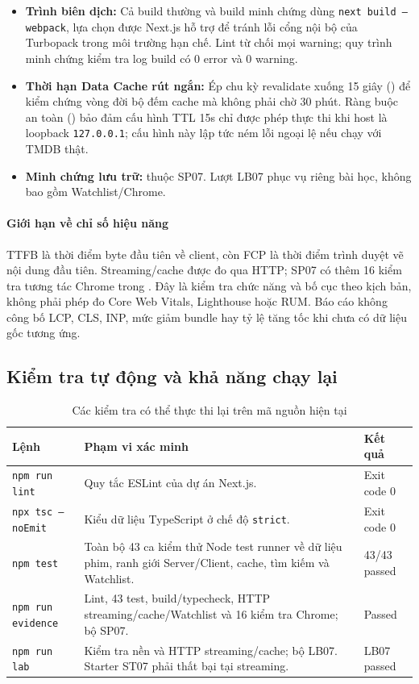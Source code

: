 \documentclass[12pt,a4paper]{extarticle}
\begin{document}
\begin{enumerate}[noitemsep]
\begin{itemize}[noitemsep]
        \item \textbf{Trình biên dịch:} Cả build thường và build minh chứng dùng \texttt{next build --webpack}, lựa chọn được Next.js hỗ trợ để tránh lỗi cổng nội bộ của Turbopack trong môi trường hạn chế. Lint từ chối mọi warning; quy trình minh chứng kiểm tra log build có 0 error và 0 warning.
        \item \textbf{Thời hạn Data Cache rút ngắn:} Ép chu kỳ revalidate xuống 15 giây () để kiểm chứng vòng đời bộ đếm cache mà không phải chờ 30 phút. Ràng buộc an toàn () bảo đảm cấu hình TTL 15s chỉ được phép thực thi khi host là loopback \texttt{127.0.0.1}; cấu hình này lập tức ném lỗi ngoại lệ nếu chạy với TMDB thật.
        \item \textbf{Minh chứng lưu trữ:}  thuộc SP07. Lượt LB07 phục vụ riêng bài học, không bao gồm Watchlist/Chrome.
    \end{itemize}
\end{enumerate}

\paragraph*{Giới hạn về chỉ số hiệu năng} TTFB là thời điểm byte đầu tiên về client, còn FCP là thời điểm trình duyệt vẽ nội dung đầu tiên. Streaming/cache được đo qua HTTP; SP07 có thêm 16 kiểm tra tương tác Chrome trong . Đây là kiểm tra chức năng và bố cục theo kịch bản, không phải phép đo Core Web Vitals, Lighthouse hoặc RUM. Báo cáo không công bố LCP, CLS, INP, mức giảm bundle hay tỷ lệ tăng tốc khi chưa có dữ liệu gốc tương ứng.

\subsection{Kiểm tra tự động và khả năng chạy lại}
\begin{table}[H]
\centering\small
\caption{Các kiểm tra có thể thực thi lại trên mã nguồn hiện tại}
\label{tab:checks}
\begin{tabularx}{\textwidth}{p{3.2cm}X p{2.1cm}}
\toprule
\textbf{Lệnh} & \textbf{Phạm vi xác minh} & \textbf{Kết quả} \\
\midrule
\texttt{npm run lint} & Quy tắc ESLint của dự án Next.js. & Exit code 0 \\
\texttt{npx tsc --noEmit} & Kiểu dữ liệu TypeScript ở chế độ \texttt{strict}. & Exit code 0 \\
\texttt{npm test} & Toàn bộ 43 ca kiểm thử Node test runner về dữ liệu phim, ranh giới Server/Client, cache, tìm kiếm và Watchlist. & 43/43 passed \\
\texttt{npm run evidence} & Lint, 43 test, build/typecheck, HTTP streaming/cache/Watchlist và 16 kiểm tra Chrome; bộ SP07. & Passed \\
\texttt{npm run lab} & Kiểm tra nền và HTTP streaming/cache; bộ LB07. Starter ST07 phải thất bại tại streaming. & LB07 passed \\
\bottomrule
\end{tabularx}
\end{table}
\end{document}
